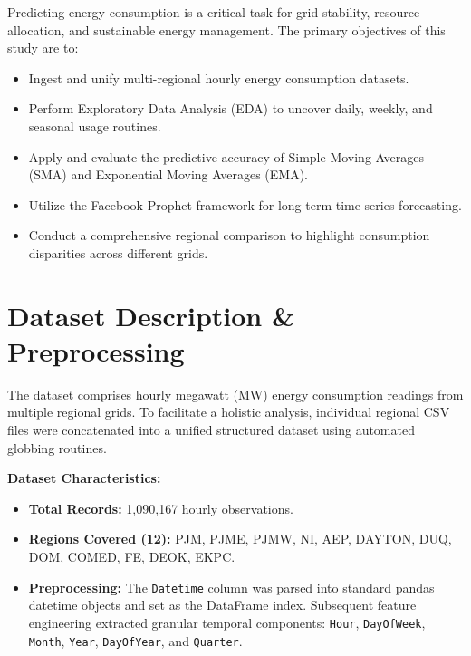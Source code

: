 \documentclass[
	letterpaper, %
	10pt, %
]{CSUniSchoolLabReport}
\begin{document}
Predicting energy consumption is a critical task for grid stability, resource allocation, and sustainable energy management. The primary objectives of this study are to:

\begin{itemize}
    \item Ingest and unify multi-regional hourly energy consumption datasets.
    \item Perform Exploratory Data Analysis (EDA) to uncover daily, weekly, and seasonal usage routines.
    \item Apply and evaluate the predictive accuracy of Simple Moving Averages (SMA) and Exponential Moving Averages (EMA).
    \item Utilize the Facebook Prophet framework for long-term time series forecasting.
    \item Conduct a comprehensive regional comparison to highlight consumption disparities across different grids.
\end{itemize}


\section{Dataset Description \& Preprocessing}

The dataset comprises hourly megawatt (MW) energy consumption readings from multiple regional grids. To facilitate a holistic analysis, individual regional CSV files were concatenated into a unified structured dataset using automated globbing routines.

\textbf{Dataset Characteristics:}
\begin{itemize}
    \item \textbf{Total Records:} 1,090,167 hourly observations.
    \item \textbf{Regions Covered (12):} PJM, PJME, PJMW, NI, AEP, DAYTON, DUQ, DOM, COMED, FE, DEOK, EKPC.
    \item \textbf{Preprocessing:} The \texttt{Datetime} column was parsed into standard pandas datetime objects and set as the DataFrame index. Subsequent feature engineering extracted granular temporal components: \texttt{Hour}, \texttt{DayOfWeek}, \texttt{Month}, \texttt{Year}, \texttt{DayOfYear}, and \texttt{Quarter}.
\end{itemize}
\end{document}
